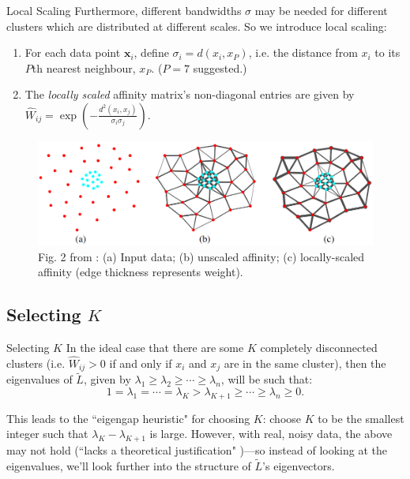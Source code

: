 \documentclass[aspectratio=169]{beamer}
\begin{document}
\begin{frame}{Local Scaling}
    Furthermore, different bandwidths $\sigma$ may be needed for different clusters which are distributed at different scales.
    So we introduce \alert{local scaling}:
    \pause
    \begin{enumerate}%
      \item For each data point $\mathbf{x}_i$, define $\sigma_i = d(x_i, x_P)$, i.e. the distance from $x_i$ to its $P$th nearest neighbour, $x_P$. ($P=7$ suggested.)
      \pause
      \item The \textit{locally scaled} affinity matrix's non-diagonal entries are given by $\hat{W}_{ij} = \exp\left(-\frac{d^2(x_i, x_j)}{\sigma_i \sigma_j}\right)$.
    \end{enumerate}
    \pause
    \begin{figure}
      \centering
      \includegraphics[scale=0.22]{local_scaling.png}
      \caption{Fig. 2 from \cite{zelnik-manor_self-tuning_2004}: (a) Input data; (b) unscaled affinity; (c) locally-scaled affinity (edge thickness represents weight).}
    \end{figure}
\end{frame}

\subsection{Selecting $K$}
\begin{frame}{Selecting $K$}
    In the ideal case that there are some $K$ completely disconnected clusters (i.e. $\hat{W}_{ij} > 0$ if and only if $x_i$ and $x_j$ are in the same cluster), then the eigenvalues of $\tilde{L}$, given by $\lambda_1 \geq \lambda_2 \geq \cdots \geq \lambda_n$, will be such that:
    \[1 = \lambda_1 = \cdots = \lambda_K > \lambda_{K+1} \geq \cdots \geq \lambda_n \geq 0.\]
    
    This leads to the ``eigengap heuristic" for choosing $K$: choose $K$ to be the smallest integer such that $\lambda_{K} - \lambda_{K+1}$ is large.
    \newline\newline
    \pause
    However, with real, noisy data, the above may not hold (``lacks a theoretical justification" \cite{zelnik-manor_self-tuning_2004})---so instead of looking at the eigenvalues, we'll look further into the structure of $\tilde{L}$'s eigenvectors.

\end{frame}
\end{document}

